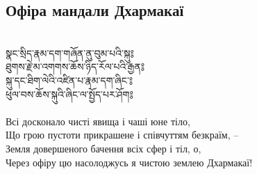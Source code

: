\subsection{Офіра мандали Дхармакаї}
\\
\ti
སྣང་སྲིད་རྣམ་དག་གཞོན་ནུ་བུམ་པའི་སྐུ༔ \\
ཐུགས་རྗེ་མ་འགགས་ཆོས་ཉིད་རོལ་པའི་རྒྱན༔\\
སྐུ་དང་ཐིག་ལེའི་འཛིན་པ་རྣམ་དག་ཞིང་༔\\
ཕུལ་བས་ཆོས་སྐུའི་ཞིང་ལ་སྤྱོད་པར་ཤོག༔\\
\\
\ru
Всі досконало чисті явища і чаші юне тіло,\\
Що грою пустоти прикрашене і співчуттям безкраїм, --\\
Земля довершеного бачення всіх сфер і тіл, о,\\
Через офіру цю насолоджусь я чистою землею Дхармакаї!\\


